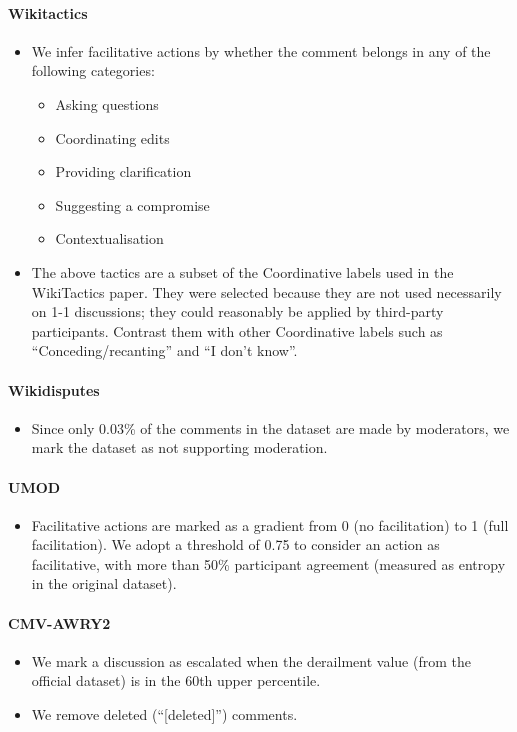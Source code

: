 \documentclass[11pt]{article}
\theoremstyle{definition}
\theoremstyle{plain}
\begin{document}
\paragraph{Wikitactics}
\begin{itemize}
	\item We infer facilitative actions by whether the comment belongs in any of the following categories:
	\begin{itemize}
		\item Asking questions
		\item Coordinating edits
		\item Providing clarification
		\item Suggesting a compromise
		\item Contextualisation
	\end{itemize}
	\item The above tactics are a subset of the Coordinative labels used in the WikiTactics paper. They were selected because they are not used necessarily on 1-1 discussions; they could reasonably be applied by third-party participants. Contrast them with other Coordinative labels such as ``Conceding/recanting'' and ``I don't know''.
\end{itemize}

\paragraph{Wikidisputes}
\begin{itemize}
	\item Since only 0.03\% of the comments in the dataset are made by moderators, we mark the dataset as not supporting moderation.
\end{itemize}

\paragraph{UMOD}
\begin{itemize}
	\item Facilitative actions are marked as a gradient from 0 (no facilitation) to 1 (full facilitation). We adopt a threshold of 0.75 to consider an action as facilitative, with more than 50\% participant agreement (measured as entropy in the original dataset).
\end{itemize}

\paragraph{CMV-AWRY2}
\begin{itemize}
	\item We mark a discussion as escalated when the derailment value (from the official dataset) is in the 60th upper percentile.
	\item We remove deleted (``[deleted]'') comments.
\end{itemize}
\end{document}
